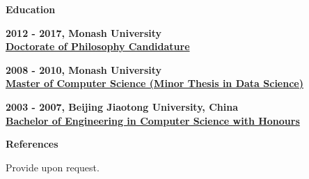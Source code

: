 \documentclass[a4paper,8pt,final]{memoir}
\newcommand{\Sep}{\vspace{1.5em}}
\newcommand{\SmallSep}{\vspace{0.5em}}
\newcommand{\CVSection}[1]
	{\Large\textbf{#1}\par
	\SmallSep\normalsize\normalfont}
\newcommand{\CVItem}[1]
	{\textbf{\color{RoyalBlue} #1}}
\begin{document}
\Sep
\Sep
\CVSection{Education}
\CVItem{2012 - 2017, Monash University}\\
\underline{\textbf{Doctorate of Philosophy Candidature}}
\Sep

\CVItem{2008 - 2010, Monash University}\\
\underline{\textbf{Master of Computer Science (Minor Thesis in Data Science)}}
\Sep

\CVItem{2003 - 2007, Beijing Jiaotong University, China}\\
\underline{\textbf{Bachelor of Engineering in Computer Science with Honours}}
\Sep
\Sep
\Sep

\CVSection{References}
Provide upon request.
%
%
%
\end{document}
